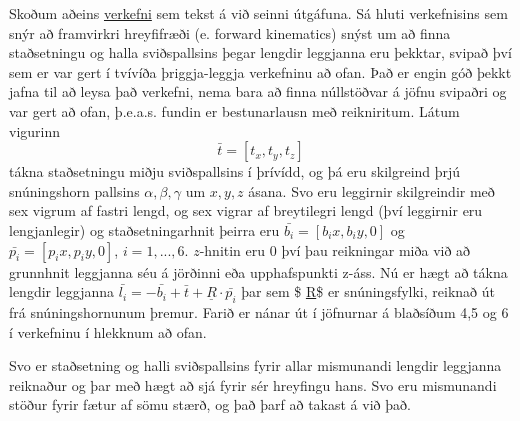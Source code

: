 \documentclass[11pt]{article}
\begin{document}
Skoðum aðeins
\href{https://www.researchgate.net/publication/2564027_Forward_Kinematics_of_a_Stewart_Platform_Mechanism}{verkefni}
sem tekst á við seinni útgáfuna. Sá hluti verkefnisins sem snýr að
framvirkri hreyfifræði (e. forward kinematics) snýst um að finna
staðsetningu og halla sviðspallsins þegar lengdir leggjanna eru þekktar,
svipað því sem er var gert í tvívíða þriggja-leggja verkefninu að ofan.
Það er engin góð þekkt jafna til að leysa það verkefni, nema bara að
finna núllstöðvar á jöfnu svipaðri og var gert að ofan, þ.e.a.s. fundin
er bestunarlausn með reikniritum. Látum vigurinn
\[\bar{t} = [t_x, t_y, t_z]\] tákna staðsetningu miðju sviðspallsins í
þrívídd, og þá eru skilgreind þrjú snúningshorn pallsins
\(\alpha, \beta, \gamma\) um \(x, y, z\) ásana. Svo eru leggirnir
skilgreindir með sex vigrum af fastri lengd, og sex vigrar af
breytilegri lengd (því leggirnir eru lengjanlegir) og staðsetningarhnit
þeirra eru \(\bar{b_i} = [b_ix, b_iy, 0]\) og
\(\bar{p_i} = [p_ix, p_iy, 0]\), \(i = 1,...,6\). \(z\)-hnitin eru \(0\)
því þau reikningar miða við að grunnhnit leggjanna séu á jörðinni eða
upphafspunkti z-áss. Nú er hægt að tákna lengdir leggjanna
\(\bar{l_i} = -\bar{b_i} + \bar{t} + \underline{R}\cdot\bar{p_i}\) þar
sem \$ \underline{R}\$ er snúningsfylki, reiknað út frá snúningshornunum
þremur. Farið er nánar út í jöfnurnar á blaðsíðum 4,5 og 6 í verkefninu
í hlekknum að ofan.

Svo er staðsetning og halli sviðspallsins fyrir allar mismunandi lengdir
leggjanna reiknaður og þar með hægt að sjá fyrir sér hreyfingu hans. Svo
eru mismunandi stöður fyrir fætur af sömu stærð, og það þarf að takast á
við það.


    
    
    
    
\end{document}
